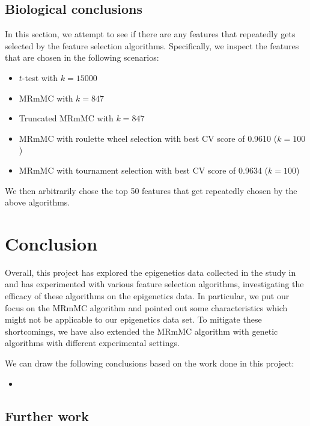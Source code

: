 \documentclass[12pt, twoside, a4paper]{report}
\begin{document}
\section{Biological conclusions}

In this section, we attempt to see if there are any features that repeatedly gets selected by the feature selection algorithms. Specifically, we inspect the features that are chosen in the following scenarios:
\begin{itemize}
  \item $t$-test with $k=15000$
  \item MRmMC with $k=847$
  \item Truncated MRmMC with $k=847$
  \item MRmMC with roulette wheel selection with best CV score of 0.9610 ($k=100$)
  \item MRmMC with tournament selection with best CV score of 0.9634 ($k=100$)
\end{itemize}

We then arbitrarily chose the top 50 features that get repeatedly chosen by the above algorithms.



\chapter{Conclusion}

Overall, this project has explored the epigenetics data collected in the study in \cite{RefWorks:78} and has experimented with various feature selection algorithms, investigating the efficacy of these algorithms on the epigenetics data. In particular, we put our focus on the MRmMC algorithm and pointed out some characteristics which might not be applicable to our epigenetics data set. To mitigate these shortcomings, we have also extended the MRmMC algorithm with genetic algorithms with different experimental settings.

We can draw the following conclusions based on the work done in this project:
\begin{itemize}
  \item 
\end{itemize}

\section{Further work} \label{further_work}
\end{document}
